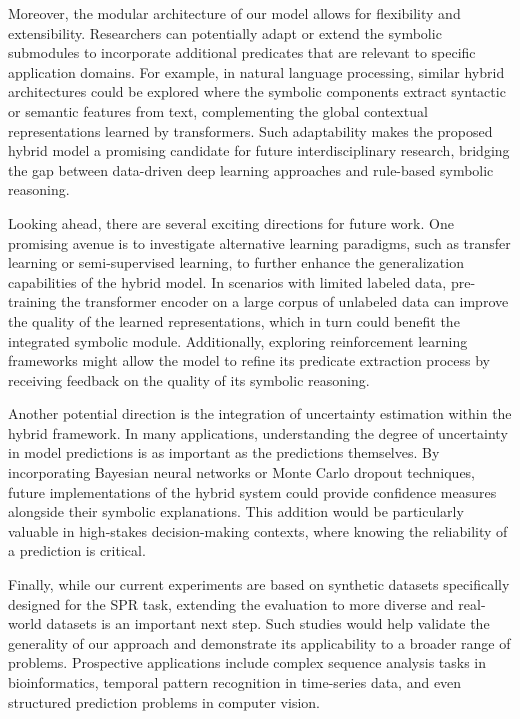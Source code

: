 \documentclass{article}
\begin{document}
Moreover, the modular architecture of our model allows for flexibility and extensibility. Researchers can potentially adapt or extend the symbolic submodules to incorporate additional predicates that are relevant to specific application domains. For example, in natural language processing, similar hybrid architectures could be explored where the symbolic components extract syntactic or semantic features from text, complementing the global contextual representations learned by transformers. Such adaptability makes the proposed hybrid model a promising candidate for future interdisciplinary research, bridging the gap between data-driven deep learning approaches and rule-based symbolic reasoning.

Looking ahead, there are several exciting directions for future work. One promising avenue is to investigate alternative learning paradigms, such as transfer learning or semi-supervised learning, to further enhance the generalization capabilities of the hybrid model. In scenarios with limited labeled data, pre-training the transformer encoder on a large corpus of unlabeled data can improve the quality of the learned representations, which in turn could benefit the integrated symbolic module. Additionally, exploring reinforcement learning frameworks might allow the model to refine its predicate extraction process by receiving feedback on the quality of its symbolic reasoning.

Another potential direction is the integration of uncertainty estimation within the hybrid framework. In many applications, understanding the degree of uncertainty in model predictions is as important as the predictions themselves. By incorporating Bayesian neural networks or Monte Carlo dropout techniques, future implementations of the hybrid system could provide confidence measures alongside their symbolic explanations. This addition would be particularly valuable in high-stakes decision-making contexts, where knowing the reliability of a prediction is critical.

Finally, while our current experiments are based on synthetic datasets specifically designed for the SPR task, extending the evaluation to more diverse and real-world datasets is an important next step. Such studies would help validate the generality of our approach and demonstrate its applicability to a broader range of problems. Prospective applications include complex sequence analysis tasks in bioinformatics, temporal pattern recognition in time-series data, and even structured prediction problems in computer vision.
\end{document}
